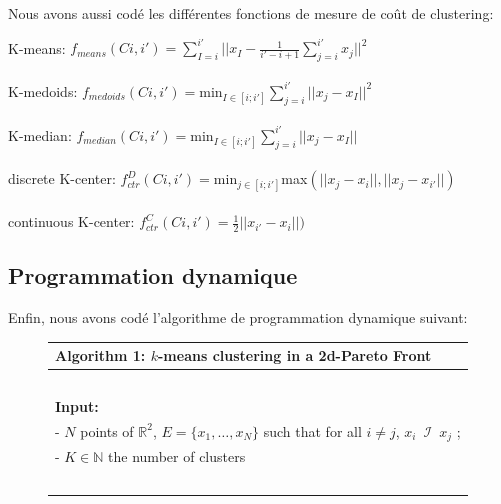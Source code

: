 ﻿\documentclass{meta}
\def\NN{{\mathbb{N}}}
\def\RR{{\mathbb{R}}}
\begin{document}
{Nous avons aussi codé les différentes fonctions de mesure de coût de clustering: 

K-means: $f_{means}(Ci,i')=\sum_{I=i}^{i'} ||x_{I}-\frac{1}{i'-i+1}\sum_{j=i}^{i'} x_{j}||^2$\\ \\ 
K-medoids: $f_{medoids}(Ci,i')=$min$_{I\in[i;i']}\sum_{j=i}^{i'} ||x_{j}-x_{I}||^2$\\ \\ 
K-median: $f_{median}(Ci,i')=$min$_{I\in[i;i']}\sum_{j=i}^{i'} ||x_{j}-x_{I}||$\\ \\ 
discrete K-center: $f_{ctr}^{D}(Ci,i')=$min$_{j\in[i;i']}$max$(||x_{j}-x_{i}||,||x_{j}-x_{i'}||)$\\ \\ 
continuous K-center: $f_{ctr}^{C}(Ci,i')= \frac{1}{2}||x_{i'}-x_{i}||)$\\

\subsection{Programmation dynamique}
Enfin, nous avons codé l'algorithme de programmation dynamique suivant:

\begin{figure}[ht]
 \centering 
\begin{tabular}{ l }
\hline
\textbf{Algorithm 1: $k$-means clustering in a 2d-Pareto Front}\\
\hline
\verb!  !\\

\textbf{Input:} \\
- $N$ points  of $\RR^2$, $E =\{x_1,\dots, x_N\}$  %
such that for all $ i\neq j$, $x_i \phantom{0} \mathcal{I} \phantom{0} x_j$ ;\\
- $K\in\NN$ the number of clusters\\

\verb!  !\\


\end{tabular}
\end{figure}}
\end{document}
